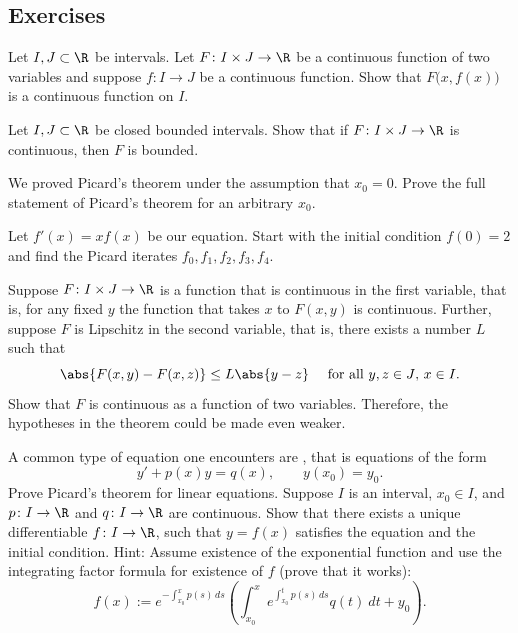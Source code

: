 \documentclass[12pt]{book}
\begin{document}
\subsection*{Exercises}

\begin{exercise}
Let $I, J \subset \R$ be intervals.
Let $F \colon I \times J \to \R$ be a continuous function
of two variables
and suppose $f \colon I \to J$ be a continuous function.
Show that $F\bigl(x,f(x)\bigr)$ is a continuous function on $I$.
\end{exercise}

\begin{exercise}
Let $I, J \subset \R$ be closed bounded intervals.
Show that if $F \colon I \times J \to \R$ is continuous,
then $F$ is bounded.
\end{exercise}

\begin{exercise}
We proved Picard's theorem under the assumption that $x_0 = 0$.
Prove the full statement of Picard's theorem for an arbitrary $x_0$.
\end{exercise}

\begin{exercise}
Let $f'(x)=x f(x)$ be our equation.
Start with the initial condition
$f(0)=2$ and find the Picard iterates $f_0,f_1,f_2,f_3,f_4$.
\end{exercise}

\begin{exercise}
Suppose $F \colon I \times J \to \R$
is a function that is continuous in the first variable,
that is, for any fixed $y$ the function that takes $x$ to $F(x,y)$ is
continuous.
Further, suppose $F$ is Lipschitz in the second variable,
that is, there exists a number $L$ such that
\begin{equation*}
\abs{F(x,y) - F(x,z)} \leq L \abs{y-z}
\ \ \ \text{ for all $y,z \in J$, $x \in I$} .
\end{equation*}
Show that $F$ is continuous as a function of two variables.
Therefore, the
hypotheses in the theorem could be made even weaker.
\end{exercise}

\begin{exercise}
A common type of equation one encounters are
\emph{}, that is
equations of the form
\begin{equation*}
y' + p(x) y = q(x) , \qquad y(x_0) = y_0 .
\end{equation*}
Prove Picard's theorem for linear equations.
Suppose $I$ is an
interval, $x_0 \in I$, and $p \colon I \to \R$ and $q \colon I \to \R$ are
continuous.
Show that there exists a unique differentiable $f \colon I \to \R$,
such that $y = f(x)$
satisfies the equation and the initial condition.
Hint: Assume existence of the exponential function and use the integrating
factor formula for existence of $f$ (prove that it works):
\begin{equation*}
f(x) := e^{-\int_{x_0}^x p(s)\, ds} \left( \int_{x_0}^x e^{\int_{x_0}^t p(s)\, ds}
q(t) ~dt + y_0 \right).
\end{equation*}
\end{exercise}
\end{document}
